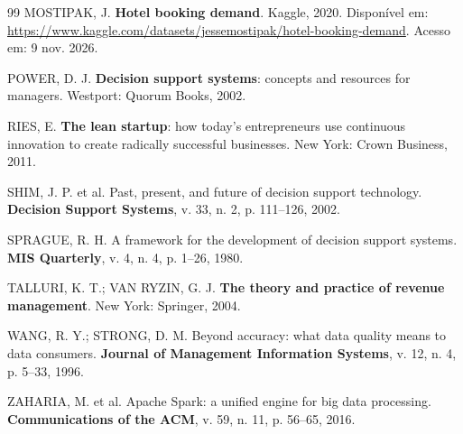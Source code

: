 \documentclass[11pt,a4paper]{article}
\begin{document}
\begin{thebibliography}{99}
MOSTIPAK, J. \textbf{Hotel booking demand}. Kaggle, 2020. Disponível em: \url{https://www.kaggle.com/datasets/jessemostipak/hotel-booking-demand}. Acesso em: 9 nov. 2026.

POWER, D. J. \textbf{Decision support systems}: concepts and resources for managers. Westport: Quorum Books, 2002.

RIES, E. \textbf{The lean startup}: how today's entrepreneurs use continuous innovation to create radically successful businesses. New York: Crown Business, 2011.

SHIM, J. P. et al. Past, present, and future of decision support technology. \textbf{Decision Support Systems}, v. 33, n. 2, p. 111--126, 2002.

SPRAGUE, R. H. A framework for the development of decision support systems. \textbf{MIS Quarterly}, v. 4, n. 4, p. 1--26, 1980.

TALLURI, K. T.; VAN RYZIN, G. J. \textbf{The theory and practice of revenue management}. New York: Springer, 2004.

WANG, R. Y.; STRONG, D. M. Beyond accuracy: what data quality means to data consumers. \textbf{Journal of Management Information Systems}, v. 12, n. 4, p. 5--33, 1996.

ZAHARIA, M. et al. Apache Spark: a unified engine for big data processing. \textbf{Communications of the ACM}, v. 59, n. 11, p. 56--65, 2016.

\end{thebibliography}
\end{document}
